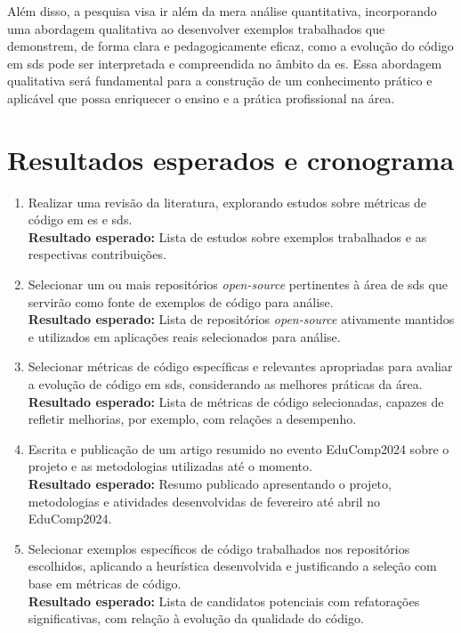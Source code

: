 Além disso, a pesquisa visa ir além da mera análise quantitativa, incorporando uma abordagem qualitativa ao desenvolver exemplos trabalhados que demonstrem, de forma clara e pedagogicamente eficaz, como a evolução do código em \gls{sds} pode ser interpretada e compreendida no âmbito da \gls{es}. Essa abordagem qualitativa será fundamental para a construção de um conhecimento prático e aplicável que possa enriquecer o ensino e a prática profissional na área.

\section{Resultados esperados e cronograma}

\begin{enumerate}
    \item Realizar uma revisão da literatura, explorando estudos sobre métricas de código em \gls{es} e \gls{sds}.
    \\\textbf{Resultado esperado:} Lista de estudos sobre exemplos trabalhados e as respectivas contribuições.

    \item Selecionar um ou mais repositórios \textit{open-source} pertinentes à área de \gls{sds} que servirão como fonte de exemplos de código para análise.
    \\\textbf{Resultado esperado:} Lista de repositórios \textit{open-source} ativamente mantidos e utilizados em aplicações reais selecionados para análise.

    \item Selecionar métricas de código específicas e relevantes apropriadas para avaliar a evolução de código em \gls{sds}, considerando as melhores práticas da área.
    \\\textbf{Resultado esperado:} Lista de métricas de código selecionadas, capazes de refletir melhorias, por exemplo, com relações a desempenho.

    \item Escrita e publicação de um artigo resumido no evento EduComp2024 sobre o projeto e as metodologias utilizadas até o momento.
    \\\textbf{Resultado esperado:} Resumo publicado apresentando o projeto, metodologias e atividades desenvolvidas de fevereiro até abril no EduComp2024.

    \item Selecionar exemplos específicos de código trabalhados nos repositórios escolhidos, aplicando a heurística desenvolvida e justificando a seleção com base em métricas de código.
    \\\textbf{Resultado esperado:} Lista de candidatos potenciais com refatorações significativas, com relação à evolução da qualidade do código.


\end{enumerate}
